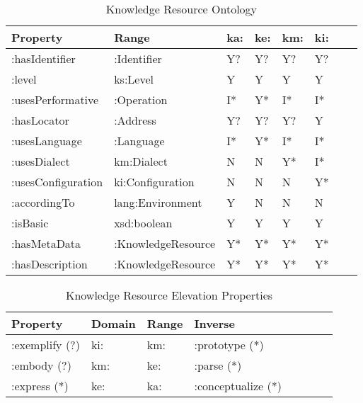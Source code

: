 \documentclass[runningheads]{llncs}
\begin{document}
\begin{table}[h]
\begin{tabular}{|l|l|l|l|l|l|l|l|}
\hline
\textbf{Property}  & \textbf{Range}
& \textbf{ka:}
& \textbf{ke:}
& \textbf{km:}
& \textbf{ki:}
\\ \hline
:hasIdentifier      & :Identifier        & Y?                & Y?                     & Y?             & Y?               \\ \hline
:level              & ks:Level           & Y                 & Y                      & Y              & Y                \\ \hline
:usesPerformative   & :Operation      & I*                & Y*                     & I*              & I*                \\ \hline
:hasLocator         & :Address           & Y?                & Y?                     & Y?             & Y                \\ \hline
:usesLanguage       & :Language       & I*                & Y*                     & I*             & I*               \\ \hline
:usesDialect        & km:Dialect        & N                 & N                      & Y*             & I*               \\ \hline
:usesConfiguration  & ki:Configuration   & N                 & N                      & N            & Y*               \\ \hline
:accordingTo        & lang:Environment     & Y                 & N                      & N              & N                \\ \hline
:isBasic            & xsd:boolean        & Y                 & Y                      & Y              & Y                \\ \hline
:hasMetaData        & :KnowledgeResource & Y*                & Y*                     & Y*             & Y*               \\ \hline
:hasDescription   & :KnowledgeResource       & Y*                & Y*                     & Y*             & Y*   \\ \hline
\end{tabular}
\caption{Knowledge Resource Ontology}
\label{kronto}
\end{table}

\begin{table}[h]
\begin{tabular}{|l|l|l|l|l|l|l|l|}
\hline
\textbf{Property}  &\textbf{Domain}  & \textbf{Range}  & \textbf{Inverse}
\\ \hline
:exemplify (?)   & ki:        & km:     & :prototype (*)         \\ \hline
:embody (?)      & km:        & ke:     & :parse (*)             \\ \hline
:express (*)     & ke:        & ka:     & :conceptualize (*)     \\ \hline
\end{tabular}
\caption{Knowledge Resource Elevation Properties}
\label{krelevationprop}
\end{table}
\end{document}
